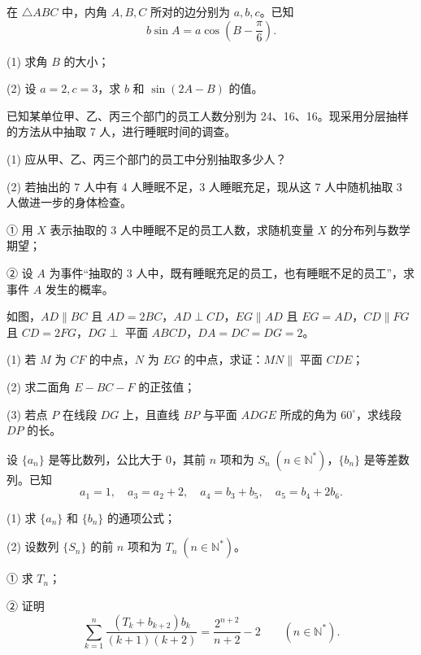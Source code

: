 \begin{question}
在 $\triangle ABC$ 中，内角 $A,B,C$ 所对的边分别为 $a,b,c$。已知
\nopagebreak[4]
\[
b\sin A=a\cos\left(B-\frac\pi6\right).
\]

(1) 求角 $B$ 的大小；

(2) 设 $a=2,c=3$，求 $b$ 和 $\sin(2A-B)$ 的值。

\end{question}
\begin{question}
已知某单位甲、乙、丙三个部门的员工人数分别为 24、16、16。现采用分层抽样的方法从中抽取 7 人，进行睡眠时间的调查。

(1) 应从甲、乙、丙三个部门的员工中分别抽取多少人？

(2) 若抽出的 7 人中有 4 人睡眠不足，3 人睡眠充足，现从这 7 人中随机抽取 3 人做进一步的身体检查。

① 用 $X$ 表示抽取的 3 人中睡眠不足的员工人数，求随机变量 $X$ 的分布列与数学期望；

② 设 $A$ 为事件“抽取的 3 人中，既有睡眠充足的员工，也有睡眠不足的员工”，求事件 $A$ 发生的概率。

\Needspace{0.4\textheight}
\end{question}
\begin{question}
如图，$AD\parallel BC$ 且 $AD=2BC$，$AD\perp CD$，$EG\parallel AD$ 且 $EG=AD$，$CD\parallel FG$ 且 $CD=2FG$，$DG\perp$ 平面 $ABCD$，$DA=DC=DG=2$。

(1) 若 $M$ 为 $CF$ 的中点，$N$ 为 $EG$ 的中点，求证：$MN\parallel$ 平面 $CDE$；

(2) 求二面角 $E-BC-F$ 的正弦值；

(3) 若点 $P$ 在线段 $DG$ 上，且直线 $BP$ 与平面 $ADGE$ 所成的角为 $60^\circ$，求线段 $DP$ 的长。
\nopagebreak[4]
\begin{center}\end{center}
\nopagebreak[4]
\end{question}
\begin{question}
设 $\{a_n\}$ 是等比数列，公比大于 0，其前 $n$ 项和为 $S_n\;(n\in\mathbb N^*)$，$\{b_n\}$ 是等差数列。已知
\nopagebreak[4]
\[
a_1=1,\quad a_3=a_2+2,\quad a_4=b_3+b_5,\quad a_5=b_4+2b_6.
\]

(1) 求 $\{a_n\}$ 和 $\{b_n\}$ 的通项公式；

(2) 设数列 $\{S_n\}$ 的前 $n$ 项和为 $T_n\;(n\in\mathbb N^*)$。

① 求 $T_n$；

② 证明
\nopagebreak[4]
\[
\sum_{k=1}^{n}\frac{(T_k+b_{k+2})b_k}{(k+1)(k+2)}=\frac{2^{n+2}}{n+2}-2\qquad(n\in\mathbb N^*).
\]

\end{question}
